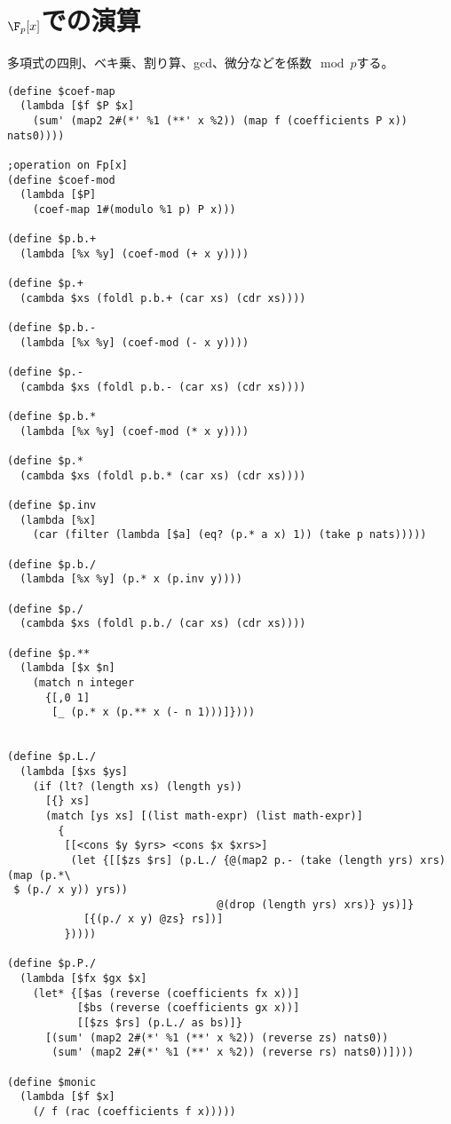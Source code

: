 \documentclass[uplatex]{jsarticle}
\begin{document}
\section{$\F_p[x]$での演算}
多項式の四則、ベキ乗、割り算、gcd、微分などを係数$\mod p$する。

{\footnotesize
\begin{verbatim}
(define $coef-map
  (lambda [$f $P $x]
    (sum' (map2 2#(*' %1 (**' x %2)) (map f (coefficients P x)) nats0))))

;operation on Fp[x]
(define $coef-mod
  (lambda [$P]
    (coef-map 1#(modulo %1 p) P x)))

(define $p.b.+
  (lambda [%x %y] (coef-mod (+ x y))))

(define $p.+
  (cambda $xs (foldl p.b.+ (car xs) (cdr xs))))

(define $p.b.-
  (lambda [%x %y] (coef-mod (- x y))))

(define $p.-
  (cambda $xs (foldl p.b.- (car xs) (cdr xs))))

(define $p.b.*
  (lambda [%x %y] (coef-mod (* x y))))

(define $p.*
  (cambda $xs (foldl p.b.* (car xs) (cdr xs))))

(define $p.inv
  (lambda [%x]
    (car (filter (lambda [$a] (eq? (p.* a x) 1)) (take p nats)))))

(define $p.b./
  (lambda [%x %y] (p.* x (p.inv y))))

(define $p./
  (cambda $xs (foldl p.b./ (car xs) (cdr xs))))

(define $p.**
  (lambda [$x $n]
    (match n integer
      {[,0 1]
       [_ (p.* x (p.** x (- n 1)))]})))
       

(define $p.L./
  (lambda [$xs $ys]
    (if (lt? (length xs) (length ys))
      [{} xs]
      (match [ys xs] [(list math-expr) (list math-expr)]
        {
         [[<cons $y $yrs> <cons $x $xrs>]
          (let {[[$zs $rs] (p.L./ {@(map2 p.- (take (length yrs) xrs) (map (p.*\
 $ (p./ x y)) yrs))
                                 @(drop (length yrs) xrs)} ys)]}
            [{(p./ x y) @zs} rs])]
         }))))

(define $p.P./
  (lambda [$fx $gx $x]
    (let* {[$as (reverse (coefficients fx x))]
           [$bs (reverse (coefficients gx x))]
           [[$zs $rs] (p.L./ as bs)]}
      [(sum' (map2 2#(*' %1 (**' x %2)) (reverse zs) nats0))
       (sum' (map2 2#(*' %1 (**' x %2)) (reverse rs) nats0))])))

(define $monic
  (lambda [$f $x]
    (/ f (rac (coefficients f x)))))


\end{verbatim}}
\end{document}
